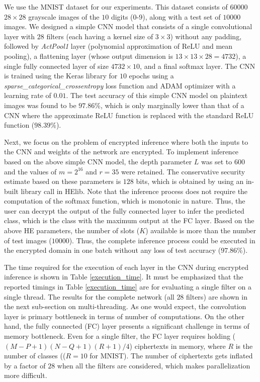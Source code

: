 \documentclass[letterpaper]{article} %
\begin{document}
We use the MNIST dataset for our experiments. This dataset consists of $60000$ $28 \times 28$ grayscale images of the $10$ digits (0-9), along with a test set of $10000$ images. We designed a simple CNN model that consists of a single convolutional layer with $28$ filters (each having a kernel size of $3 \times 3$) without any padding, followed by \emph{ActPool1} layer (polynomial approximation of ReLU and mean pooling), a flattening layer (whose output dimension is $13 \times 13 \times 28 = 4732$), a single fully connected layer of size $4732 \times 10$, and a final softmax layer. The CNN is trained using the Keras library for $10$ epochs using a {\em sparse\_categorical\_crossentropy} loss function and ADAM optimizer with a learning rate of $0.01$. The test accuracy of this simple CNN model on plaintext images was found to be $97.86$\%, which is only marginally lower than that of a CNN where the approximate ReLU function is replaced with the standard ReLU function ($98.39$\%).

Next, we focus on the problem of encrypted inference where both the inputs to the CNN and weights of the network are encrypted. To implement inference based on the above simple CNN model, the depth parameter $L$ was set to $600$ and the values of $m = 2^{16}$ and $r = 35$ were retained. The conservative security estimate based on these parameters is $128$ bits, which is obtained by using an in-built library call in HElib. Note that the inference process does not require the computation of the softmax function, which is monotonic in nature. Thus, the user can decrypt the output of the fully connected layer to infer the predicted class, which is the class with the maximum output at the FC layer. Based on the above HE parameters, the number of slots ($K$) available is more than the number of test images ($10000$). Thus, the complete inference process could be executed in the encrypted domain in one batch without any loss of test accuracy ($97.86$\%).

The time required for the execution of each layer in the CNN during encrypted inference is shown in Table \ref{execution_time}. It must be emphasized that the reported timings in Table \ref{execution_time} are for evaluating a single filter on a single thread. The results for the complete network (all $28$ filters) are shown in the next sub-section on multi-threading. As one would expect, the convolution layer is primary bottleneck in terms of number of computations. On the other hand, the fully connected (FC) layer presents a significant challenge in terms of memory bottleneck. Even for a single filter, the FC layer requires holding ($(M-P+1)(N-Q+1)(R+1)/4$) ciphertexts in memory, where $R$ is the number of classes (($R=10$ for MNIST). The number of ciphertexts gets inflated by a factor of $28$ when all the filters are considered, which makes parallelization more difficult.
\end{document}
